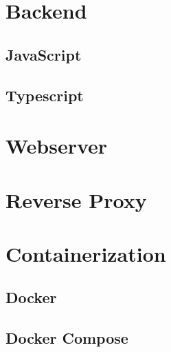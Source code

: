 \section{Backend}
\subsection{JavaScript}
\subsection{Typescript}

\section{Webserver}

\section{Reverse Proxy}

\section{Containerization}
\subsection{Docker}
\subsection{Docker Compose}